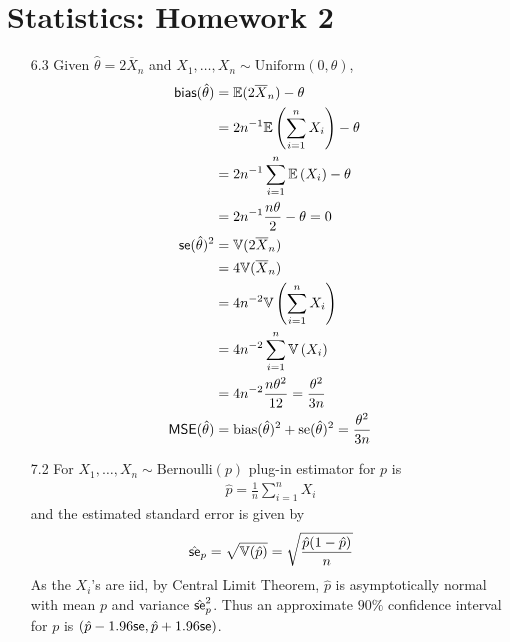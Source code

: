 \documentclass[a4paper,10pt]{article}
\theoremstyle{definition}
\begin{document}
\section*{Statistics: Homework 2}

\begin{enumerate}
\item[6.3] Given $\hat{\theta} = 2\overline{X}_n$ and $X_1, \ldots, X_n \sim \text{Uniform}(0,\theta)$,
\begin{align*}
\text{\sffamily bias}(\hat{\theta}) & =\mathbb{E}(2\overline{X}_n)-\theta\\
& =2n^{-1}\mathbb{E}\left(\sum_{i=1}^{n}{X}_i\right)-\theta\\
& =2n^{-1}\sum_{i=1}^{n}\mathbb{E}\left({X}_i\right)-\theta\\
& =2n^{-1}\frac{n\theta}{2}-\theta=0\\
\text{\sffamily se}(\hat{\theta})^2 & = \mathbb{V}(2\overline{X}_n)\\
& = 4\mathbb{V}(\overline{X}_n)\\
&=4n^{-2}\mathbb{V}\left(\sum_{i=1}^{n}{X}_i\right)\\
&=4n^{-2}\sum_{i=1}^{n}\mathbb{V}\left({X}_i\right)\\
&=4n^{-2}\frac{n\theta^2}{12} = \frac{\theta^2}{3n}\\
\text{\sffamily MSE}(\hat{\theta}) &= \text{bias}(\hat{\theta})^2+\text{se}(\hat{\theta})^2 = \frac{\theta^2}{3n}
\end{align*}
\item[7.2] For $X_1, \ldots, X_n \sim \text{Bernoulli}(p)$ plug-in estimator for $p$ is 
\begin{align*}
\hat{p}=\frac{1}{n}\sum_{i=1}^{n}X_i
\end{align*}
and the estimated standard error is given by
\begin{align*}
\hat{\text{\sffamily se}}_p = \sqrt{\mathbb{V}(\hat{p})} = \sqrt{\frac{\hat{p}(1-\hat{p})}{n} }
\end{align*}
As the $X_i$'s are iid, by Central Limit Theorem, $\hat{p}$ is asymptotically normal with mean $p$ and variance $\hat{\text{\sffamily se}}_p^2$. Thus an approximate $90\%$ confidence interval for $p$ is $(\hat{p}-1.96\text{\sffamily se},\hat{p}+1.96\text{\sffamily se})$.


\end{enumerate}
\end{document}
